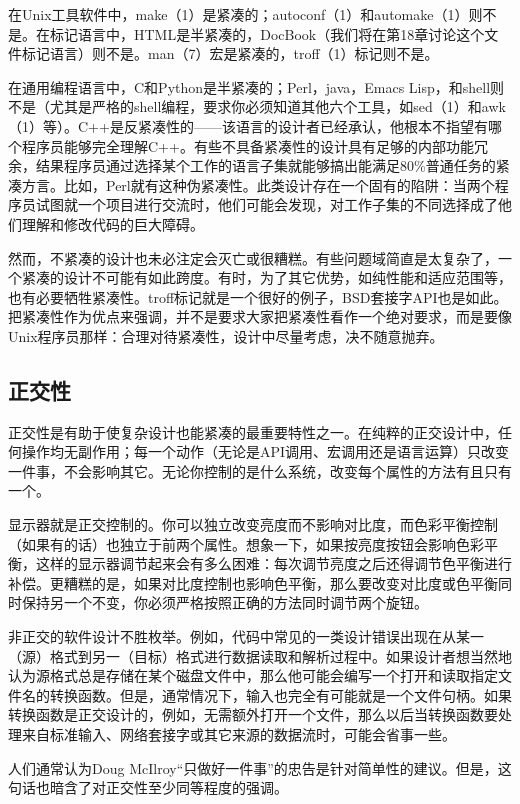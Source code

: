 \documentclass[12pt,oneside]{book}
\begin{document}
在Unix工具软件中，make（1）是紧凑的；autoconf（1）和automake（1）则不是。在标记语言中，HTML是半紧凑的，DocBook（我们将在第18章讨论这个文件标记语言）则不是。man（7）宏是紧凑的，troff（1）标记则不是。

在通用编程语言中，C和Python是半紧凑的；Perl，java，Emacs Lisp，和shell则不是（尤其是严格的shell编程，要求你必须知道其他六个工具，如sed（1）和awk（1）等）。C++是反紧凑性的——该语言的设计者已经承认，他根本不指望有哪个程序员能够完全理解C++。有些不具备紧凑性的设计具有足够的内部功能冗余，结果程序员通过选择某个工作的语言子集就能够搞出能满足80\%普通任务的紧凑方言。比如，Perl就有这种伪紧凑性。此类设计存在一个固有的陷阱：当两个程序员试图就一个项目进行交流时，他们可能会发现，对工作子集的不同选择成了他们理解和修改代码的巨大障碍。

然而，不紧凑的设计也未必注定会灭亡或很糟糕。有些问题域简直是太复杂了，一个紧凑的设计不可能有如此跨度。有时，为了其它优势，如纯性能和适应范围等，也有必要牺牲紧凑性。troff标记就是一个很好的例子，BSD套接字API也是如此。把紧凑性作为优点来强调，并不是要求大家把紧凑性看作一个绝对要求，而是要像Unix程序员那样：合理对待紧凑性，设计中尽量考虑，决不随意抛弃。

\subsection{正交性}
正交性是有助于使复杂设计也能紧凑的最重要特性之一。在纯粹的正交设计中，任何操作均无副作用；每一个动作（无论是API调用、宏调用还是语言运算）只改变一件事，不会影响其它。无论你控制的是什么系统，改变每个属性的方法有且只有一个。

显示器就是正交控制的。你可以独立改变亮度而不影响对比度，而色彩平衡控制（如果有的话）也独立于前两个属性。想象一下，如果按亮度按钮会影响色彩平衡，这样的显示器调节起来会有多么困难：每次调节亮度之后还得调节色平衡进行补偿。更糟糕的是，如果对比度控制也影响色平衡，那么要改变对比度或色平衡同时保持另一个不变，你必须严格按照正确的方法同时调节两个旋钮。

非正交的软件设计不胜枚举。例如，代码中常见的一类设计错误出现在从某一（源）格式到另一（目标）格式进行数据读取和解析过程中。如果设计者想当然地认为源格式总是存储在某个磁盘文件中，那么他可能会编写一个打开和读取指定文件名的转换函数。但是，通常情况下，输入也完全有可能就是一个文件句柄。如果转换函数是正交设计的，例如，无需额外打开一个文件，那么以后当转换函数要处理来自标准输入、网络套接字或其它来源的数据流时，可能会省事一些。

人们通常认为Doug McIlroy“只做好一件事”的忠告是针对简单性的建议。但是，这句话也暗含了对正交性至少同等程度的强调。
\end{document}
